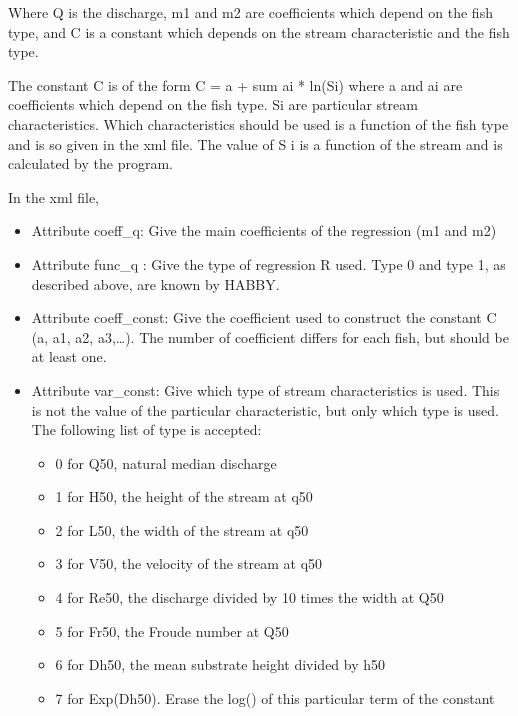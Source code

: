 \documentclass[letterpaper,10pt,english]{sphinxmanual}
\begin{document}
Where Q is the discharge, m1 and m2 are coefficients which depend on the fish type, and C is a
constant which depends on the stream characteristic and the fish type.

The constant C is of the form C = a + sum ai * ln(Si) where a and ai are coefficients which depend on
the fish type. Si are particular stream characteristics. Which characteristics should be used is a
function of the fish type and is so given in the xml file. The value of S i is a function of the stream
and is calculated by the program.

In the xml file,
\begin{itemize}
\item {} 
Attribute coeff\_q: Give the main coefficients of the regression (m1 and m2)

\item {} 
Attribute func\_q : Give the type of regression R used.  Type 0 and type 1, as described above, are known by HABBY.

\item {} 
Attribute coeff\_const: Give the coefficient used to construct the constant C (a, a1, a2, a3,…). The number of coefficient differs for each fish, but should be at least one.

\item {} 
Attribute var\_const: Give which type of stream characteristics is used. This is not the value of the particular characteristic, but only which type is used. The following list of type is accepted:
\begin{itemize}
\item {} 
0 for Q50, natural median discharge

\item {} 
1 for H50, the height of the stream at q50

\item {} 
2 for L50, the width of the stream at q50

\item {} 
3 for V50, the velocity of the stream at q50

\item {} 
4 for Re50, the discharge divided by 10 times the width at Q50

\item {} 
5 for Fr50, the Froude number at Q50

\item {} 
6 for Dh50, the mean substrate height divided by h50

\item {} 
7 for Exp(Dh50). Erase the log() of this particular term of the constant

\end{itemize}

\end{itemize}
\end{document}
